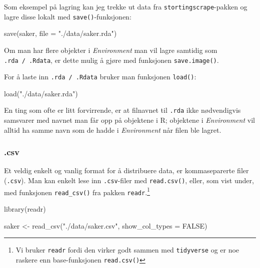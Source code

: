\documentclass[
]{article}
\newenvironment{Shaded}{\begin{snugshade}}{\end{snugshade}}
\newcommand{\AttributeTok}[1]{\textcolor[rgb]{0.77,0.63,0.00}{#1}}
\newcommand{\ConstantTok}[1]{\textcolor[rgb]{0.00,0.00,0.00}{#1}}
\newcommand{\FunctionTok}[1]{\textcolor[rgb]{0.00,0.00,0.00}{#1}}
\newcommand{\NormalTok}[1]{#1}
\newcommand{\OtherTok}[1]{\textcolor[rgb]{0.56,0.35,0.01}{#1}}
\newcommand{\StringTok}[1]{\textcolor[rgb]{0.31,0.60,0.02}{#1}}
\begin{document}
Som eksempel på lagring kan jeg trekke ut data fra
\texttt{stortingscrape}-pakken og lagre disse lokalt med
\texttt{save()}-funksjonen:

\begin{Shaded}
\begin{Highlighting}[]
\FunctionTok{save}\NormalTok{(saker, }\AttributeTok{file =} \StringTok{"./data/saker.rda"}\NormalTok{)}
\end{Highlighting}
\end{Shaded}

Om man har flere objekter i \emph{Environment} man vil lagre samtidig
som \texttt{.rda\ /\ .Rdata}, er dette mulig å gjøre med funksjonen
\texttt{save.image()}.

For å laste inn \texttt{.rda\ /\ .Rdata} bruker man funksjonen
\texttt{load()}:

\begin{Shaded}
\begin{Highlighting}[]
\FunctionTok{load}\NormalTok{(}\StringTok{"./data/saker.rda"}\NormalTok{)}
\end{Highlighting}
\end{Shaded}

En ting som ofte er litt forvirrende, er at filnavnet til \texttt{.rda}
ikke nødvendigvis samsvarer med navnet man får opp på objektene i R;
objektene i \emph{Environment} vil alltid ha samme navn som de hadde i
\emph{Environment} når filen ble lagret.

\hypertarget{csv}{%
\subsubsection{.csv}\label{csv}}

Et veldig enkelt og vanlig format for å distribuere data, er
kommaseparerte filer (\texttt{.csv}). Man kan enkelt lese inn
\texttt{.csv}-filer med \texttt{read.csv()}, eller, som vist under, med
funksjonen \texttt{read\_csv()} fra pakken \texttt{readr}.\footnote{Vi
  bruker \texttt{readr} fordi den virker godt sammen med
  \texttt{tidyverse} og er noe raskere enn base-funksjonen
  \texttt{read.csv()}}

\begin{Shaded}
\begin{Highlighting}[]
\FunctionTok{library}\NormalTok{(readr)}

\NormalTok{saker }\OtherTok{\textless{}{-}} \FunctionTok{read\_csv}\NormalTok{(}\StringTok{"./data/saker.csv"}\NormalTok{, }\AttributeTok{show\_col\_types =} \ConstantTok{FALSE}\NormalTok{)}
\end{Highlighting}
\end{Shaded}
\end{document}
